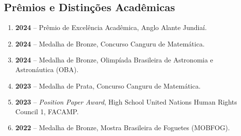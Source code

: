 \documentclass[a4paper,10pt]{article}
\begin{document}
\subsection{Prêmios e Distinções Acadêmicas}
\begin{enumerate}
    \item \textbf{2024} – Prêmio de Excelência Acadêmica, Anglo Alante Jundiaí.
    \item \textbf{2024} – Medalha de Bronze, Concurso Canguru de Matemática.
    \item \textbf{2024} – Medalha de Bronze, Olimpíada Brasileira de Astronomia e Astronáutica (OBA).
    \item \textbf{2023} – Medalha de Prata, Concurso Canguru de Matemática.
    \item \textbf{2023} – \textit{Position Paper Award}, High School United Nations Human Rights Council 1, FACAMP.
    \item \textbf{2022} – Medalha de Bronze, Mostra Brasileira de Foguetes (MOBFOG).
\end{enumerate}
\end{document}
